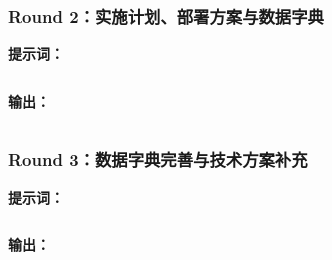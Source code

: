 \documentclass[12pt, a4paper]{academics}
\begin{document}
\subsubsection{Round 2：实施计划、部署方案与数据字典}

\textbf{提示词：}
\inputminted[]{text}{../res/phase2-round2-prompt.md}

\textbf{输出：}
\inputminted[]{text}{../res/phase2-round2-output.md}

\subsubsection{Round 3：数据字典完善与技术方案补充}

\textbf{提示词：}
\inputminted[]{text}{../res/phase2-round3-prompt.md}

\textbf{输出：}
\inputminted[]{text}{../res/phase2-round3-output.md}
\end{document}
